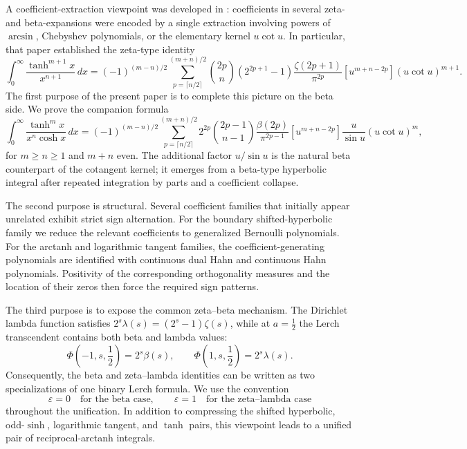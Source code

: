 \documentclass[11pt,twoside]{article}
\numberwithin{equation}{section}
\begin{document}
A coefficient-extraction viewpoint was developed in
\cite{TallaWaffo2026}: coefficients in several zeta- and beta-expansions
were encoded by a single extraction involving powers of \(\arcsin\),
Chebyshev polynomials, or the elementary kernel \(u\cot u\).  In
particular, that paper established the zeta-type identity
\[
\int_0^\infty\frac{\tanh^{m+1}x}{x^{n+1}}\,dx
=
(-1)^{(m-n)/2}
\sum_{p=\lceil n/2\rceil}^{(m+n)/2}
\binom{2p}{n}(2^{2p+1}-1)
\frac{\zeta(2p+1)}{\pi^{2p}}
[u^{m+n-2p}](u\cot u)^{m+1}.
\]
The first purpose of the present paper is to complete this picture on the
beta side.  We prove the companion formula
\[
\int_0^\infty
\frac{\tanh^m x}{x^n\cosh x}\,dx
=
(-1)^{(m-n)/2}
\sum_{p=\lceil n/2\rceil}^{(m+n)/2}
2^{2p}\binom{2p-1}{n-1}
\frac{\beta(2p)}{\pi^{2p-1}}
[u^{m+n-2p}]
\frac{u}{\sin u}(u\cot u)^m,
\]
for \(m\geq n\geq1\) and \(m+n\) even.  The additional factor
\(u/\sin u\) is the natural beta counterpart of the cotangent kernel;
it emerges from a beta-type hyperbolic integral after repeated
integration by parts and a coefficient collapse.

\vspace{0.2cm}

The second purpose is structural.  Several coefficient families that
initially appear unrelated exhibit strict sign alternation.  For the
boundary shifted-hyperbolic family we reduce the relevant coefficients
to generalized Bernoulli polynomials.  For the arctanh and logarithmic
tangent families, the coefficient-generating polynomials are identified
with continuous dual Hahn and continuous Hahn polynomials.  Positivity
of the corresponding orthogonality measures and the location of their
zeros then force the required sign patterns.

\vspace{0.2cm}

The third purpose is to expose the common zeta--beta mechanism.  The
Dirichlet lambda function satisfies
\(2^s\lambda(s)=(2^s-1)\zeta(s)\), while at \(a=\frac12\) the Lerch
transcendent contains both beta and lambda values:
\[
\Phi\!\left(-1,s,\frac12\right)=2^s\beta(s),
\qquad
\Phi\!\left(1,s,\frac12\right)=2^s\lambda(s).
\]
Consequently, the beta and zeta--lambda identities can be written as two
specializations of one binary Lerch formula.  We use the convention
\[
\varepsilon=0\quad\text{for the beta case},
\qquad
\varepsilon=1\quad\text{for the zeta--lambda case}
\]
throughout the unification.  In addition to compressing the shifted
hyperbolic, odd-\(\sinh\), logarithmic tangent, and \(\tanh\) pairs, this
viewpoint leads to a unified pair of reciprocal-arctanh integrals.
\end{document}
